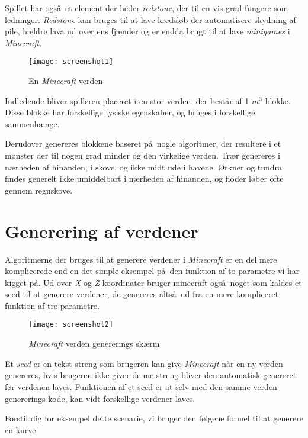 \documentclass[a4paper,12pt]{report}
\begin{document}
		Spillet har ogs\aa \ et element der heder \emph{redstone}, der til en vis grad fungere som ledninger.
		\emph{Redstone} kan bruges til at lave kredsl\o b der automatisere skydning af pile, h\ae ldre lava
		ud over ens fj\ae nder og er endda brugt til at lave \emph{minigames} i \emph{Minecraft}.

		\begin{figure}
			\texttt{[image: screenshot1]}
			\caption{En \emph{Minecraft} verden}
		\end{figure}

		Indledende bliver spilleren placeret i en stor verden, der best\aa r af 1 \(m^3\) blokke. Disse blokke har forskellige fysiske egenskaber,
		og bruges i forskellige sammenh\ae nge.

		Derudover genereres blokkene baseret p\aa \ nogle algoritmer, der resultere i et m\o nster der til nogen grad minder
		og den virkelige verden. Tr\ae r genereres i n\ae rheden af hinanden, i skove, og ikke midt ude i havene.
		\O rkner og tundra findes generelt ikke umiddelbart i n\ae rheden af hinanden, og floder l\o ber ofte gennem regnskove. 
	\section{Generering af verdener}
		Algoritmerne der bruges til at generere verdener i \emph{Minecraft} er en del mere komplicerede end en det simple eksempel p\aa \ den funktion
		af to parametre vi har kigget p\aa . Ud over \emph{X} og \emph{Z} koordinater bruger minecraft ogs\aa \ noget som kaldes et seed til at generere
		verdener, de genereres alts\aa \ ud fra en mere kompliceret funktion af tre parametre.
		
		\begin{wrapfigure}{r}{0.5\textwidth}
			\texttt{[image: screenshot2]}
			\caption{\emph{Minecraft} verden genererings sk\ae rm}
		\end{wrapfigure}

		Et \emph{seed} er en tekst streng som brugeren kan give \emph{Minecraft} n\aa r en ny verden genereres, hvis brugeren ikke giver denne streng
		bliver den automatisk genereret f\o r verdenen laves. Funktionen af et seed er at selv med den samme verden genererings kode,
		kan vidt forskellige verdener laves.

		Forstil dig for eksempel dette scenarie, vi bruger den f\o lgene formel til at generere en kurve
\end{document}
